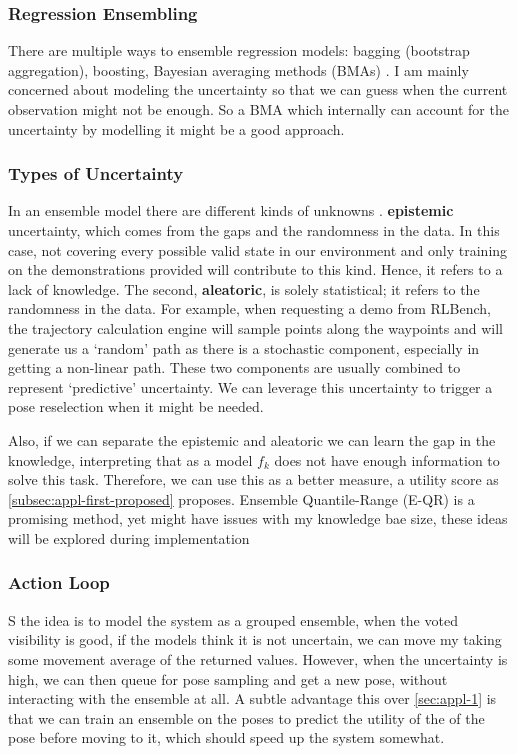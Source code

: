 \subsubsection{Regression Ensembling}
There are multiple ways to ensemble regression models: bagging (bootstrap aggregation)\cite{Breiman1996}, boosting, Bayesian averaging methods (BMAs) \cite{saito2024uncertaintyquantificationmassmodels,tang2014towards}. I am mainly concerned about modeling the uncertainty so that we can guess when the current observation might not be enough. So a BMA which internally can account for the uncertainty by modelling it might be a good approach.


\subsubsection{Types of Uncertainty}
In an ensemble model there are different kinds of unknowns \cite{Gal2016Uncertainty, H_llermeier_2021, valdenegrotoro2022deeperlookaleatoricepistemic}. \textbf{epistemic} uncertainty, which comes from the gaps and the randomness in the data. In this case, not covering every possible valid state in our environment and only training on the demonstrations provided will contribute to this kind. Hence, it refers to a lack of knowledge. The second, \textbf{aleatoric}, is solely statistical; it refers to the randomness in the data. For example, when requesting a demo from RLBench, the trajectory calculation engine will sample points along the waypoints and will generate us a `random' path as there is a stochastic component, especially in getting a non-linear path. These two components are usually combined to represent `predictive' uncertainty. We can leverage this uncertainty to trigger a pose reselection when it might be needed.

Also, if we can separate the epistemic and aleatoric we can learn the gap in the knowledge, interpreting that as a model $f_k$ does not have enough information to solve this task. Therefore, we can use this as a better measure, a utility score as \ref{subsec:appl-first-proposed} proposes. Ensemble Quantile-Range (E-QR) \cite{ansari2024eqr} is a promising method, yet might have issues with my  knowledge bae size, these ideas will be explored during implementation

\subsubsection{Action Loop}
S the idea is to model the system as a grouped ensemble, when the voted visibility is good, if the models think it is not uncertain, we can move my taking some movement average of the returned values. However, when the uncertainty is high, we can then queue for pose sampling and get a new pose, without interacting with the ensemble at all. A subtle advantage this over \ref{sec:appl-1} is that we can train an ensemble on the poses to predict the utility of the of the pose before moving to it, which should speed up the system somewhat.

